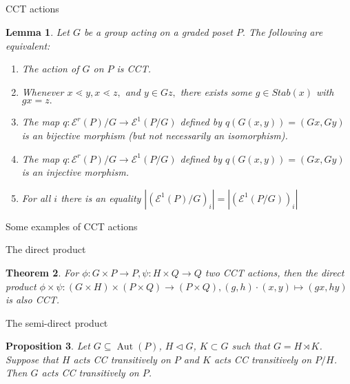 \documentclass{beamer}
\newtheorem{thm}{Theorem}
\newtheorem{lem}[thm]{Lemma}
\newtheorem{prop}[thm]{Proposition}
\theoremstyle{remark}
\begin{document}
\subsection{}
\begin{frame}{CCT actions}
\begin{lem}
\label{lem:cover_transitive_equivalence}
Let $G$ be a group acting on a graded poset $P.$ The following are equivalent:
\begin{enumerate}
	\item The action of $G$ on $P$ is CCT.
	\item Whenever $x \lessdot y,x \lessdot z,$ and $y \in Gz,$ there exists some $g \in Stab(x)$ with $gx = z.$
	\item The map $q\colon \mathcal E^r(P)/G\rightarrow \mathcal E^1(P/G)$ defined by $q(G(x, y)) = (Gx,Gy)$ is an bijective morphism (but not necessarily an isomorphism).
	\item The map $q\colon \mathcal E^r(P)/G\rightarrow \mathcal E^1(P/G)$ defined by $q(G(x, y)) = (Gx,Gy)$ is an injective morphism.
	\item For all $i$ there is an equality $|(\mathcal E^1(P)/G)_i|=| (\mathcal E^1(P/G))_i|$
\end{enumerate}
\end{lem}
\end{frame}





\begin{frame}{Some examples of CCT actions}

\end{frame}




\begin{frame}{The direct product}
\begin{thm}
\label{thm:direct_product_preservation}
For $\phi:G\times P\rightarrow P,\psi:H \times Q \rightarrow Q$ two CCT actions, then the direct product $\phi \times \psi:(G\times H)\times (P\times Q) \rightarrow (P\times Q),(g,h)\cdot (x,y) \mapsto (gx,hy)$ is also CCT.
\end{thm}
\end{frame}





\begin{frame}{The semi-direct product}
\begin{prop}\label{prop:semidirect_product_cover_transitive_actions}
Let $G\subseteq \operatorname{Aut}(P)$, $H\triangleleft G$, $K\subset G$ such that $G = H\rtimes K$.  Suppose that $H$ acts CC transitively on $P$ and $K$ acts CC transitively on $P/H$.  Then $G$ acts CC transitively on $P$.
\end{prop}
\end{frame}
\end{document}
